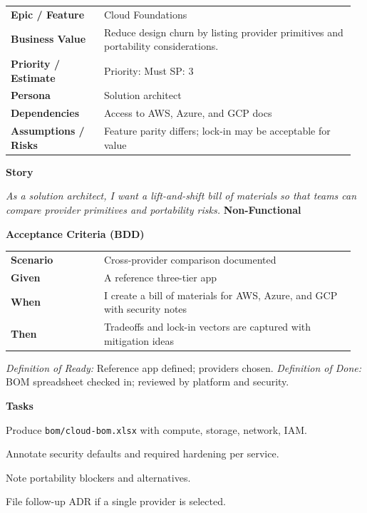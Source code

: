 \documentclass[11pt,letterpaper]{article}
\makeatletter
\newenvironment{kvtable}{%
  \begin{tabular}{@{}>{\bfseries\arraybackslash}p{0.26\linewidth} p{0.70\linewidth}@{}}
}{\end{tabular}}
\newenvironment{bdd}{%
  \begin{tabular}{@{}>{\bfseries\arraybackslash}p{0.26\linewidth} p{0.70\linewidth}@{}}
}{\end{tabular}}
\newcommand{\DoRDoD}[2]{%
  \vspace{0.35em}
  {\footnotesize\color{Muted}%
    \textit{Definition of Ready:} #1 \; \textbullet\;
    \textit{Definition of Done:} #2%
  }%
}
\newenvironment{storycard}[2]{%
  \begin{tcolorbox}[cloudcard, title={#1 --- #2}]%
}{\end{tcolorbox}}
\newcommand{\sectionlabel}[1]{\vspace{0.35em}\textbf{#1}\par}
\makeatother
\begin{document}
\begin{storycard}{CCS-2}{Ch. 2 — Overview of Cloud Computing}
\begin{kvtable}
Epic / Feature & Cloud Foundations\\
Business Value & Reduce design churn by listing provider primitives and portability considerations.\\
Priority / Estimate & Priority: Must \quad SP: 3\\
Persona & Solution architect\\
Dependencies & Access to AWS, Azure, and GCP docs\\
Assumptions / Risks & Feature parity differs; lock-in may be acceptable for value\\
\end{kvtable}
\sectionlabel{Story}
\textit{As a solution architect, I want a lift-and-shift bill of materials so that teams can compare provider primitives and portability risks.}
\sectionlabel{Non-Functional}\;\;
\sectionlabel{Acceptance Criteria (BDD)}
\begin{bdd}
Scenario & Cross-provider comparison documented\\
Given & A reference three-tier app\\
When & I create a bill of materials for AWS, Azure, and GCP with security notes\\
Then & Tradeoffs and lock-in vectors are captured with mitigation ideas\\
\end{bdd}
\DoRDoD{Reference app defined; providers chosen.}{BOM spreadsheet checked in; reviewed by platform and security.}
\sectionlabel{Tasks}
\begin{checklist}
\item Produce \texttt{bom/cloud-bom.xlsx} with compute, storage, network, IAM.
\item Annotate security defaults and required hardening per service.
\item Note portability blockers and alternatives.
\item File follow-up ADR if a single provider is selected.
\end{checklist}
\end{storycard}
\end{document}

